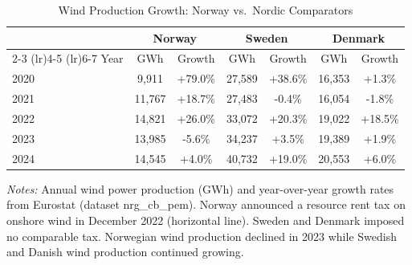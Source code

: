 \begin{table}[H]
\centering
\caption{Wind Production Growth: Norway vs.\ Nordic Comparators}
\label{tab:cross_country}
\begin{threeparttable}
\begin{tabular}{lcccccc}
\toprule
 & \multicolumn{2}{c}{Norway} & \multicolumn{2}{c}{Sweden} & \multicolumn{2}{c}{Denmark} \\
\cmidrule(lr){2-3} \cmidrule(lr){4-5} \cmidrule(lr){6-7}
Year & GWh & Growth & GWh & Growth & GWh & Growth \\
\midrule
2020 & 9,911 & +79.0\% & 27,589 & +38.6\% & 16,353 & +1.3\% \\
2021 & 11,767 & +18.7\% & 27,483 & -0.4\% & 16,054 & -1.8\% \\
2022 & 14,821 & +26.0\% & 33,072 & +20.3\% & 19,022 & +18.5\% \\
\midrule
2023 & 13,985 & -5.6\% & 34,237 & +3.5\% & 19,389 & +1.9\% \\
2024 & 14,545 & +4.0\% & 40,732 & +19.0\% & 20,553 & +6.0\% \\
\bottomrule
\end{tabular}
\begin{tablenotes}[flushleft]
\small
\item \textit{Notes:} Annual wind power production (GWh) and year-over-year growth rates from Eurostat (dataset nrg\_cb\_pem). Norway announced a resource rent tax on onshore wind in December 2022 (horizontal line). Sweden and Denmark imposed no comparable tax. Norwegian wind production declined in 2023 while Swedish and Danish wind production continued growing.
\end{tablenotes}
\end{threeparttable}
\end{table}


